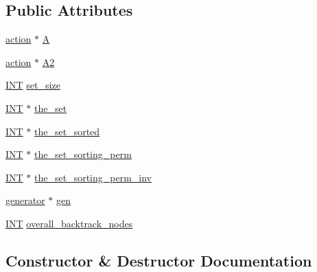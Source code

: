 \subsection*{Public Attributes}
\begin{DoxyCompactItemize}
\item 
\mbox{\hyperlink{classaction}{action}} $\ast$ \mbox{\hyperlink{classset__stabilizer__compute_a2d64c5c51d63999c9904b79b8d5dd7bf}{A}}
\item 
\mbox{\hyperlink{classaction}{action}} $\ast$ \mbox{\hyperlink{classset__stabilizer__compute_a903121f8202760ad84c96cc46a9ac1b2}{A2}}
\item 
\mbox{\hyperlink{galois_8h_a09fddde158a3a20bd2dcadb609de11dc}{I\+NT}} \mbox{\hyperlink{classset__stabilizer__compute_a03e43056f6968c46565e693a6788f24e}{set\+\_\+size}}
\item 
\mbox{\hyperlink{galois_8h_a09fddde158a3a20bd2dcadb609de11dc}{I\+NT}} $\ast$ \mbox{\hyperlink{classset__stabilizer__compute_a71c532d0589c53dcc166c061cffa171c}{the\+\_\+set}}
\item 
\mbox{\hyperlink{galois_8h_a09fddde158a3a20bd2dcadb609de11dc}{I\+NT}} $\ast$ \mbox{\hyperlink{classset__stabilizer__compute_a4e17cf5cd65318a15865edb1d323e655}{the\+\_\+set\+\_\+sorted}}
\item 
\mbox{\hyperlink{galois_8h_a09fddde158a3a20bd2dcadb609de11dc}{I\+NT}} $\ast$ \mbox{\hyperlink{classset__stabilizer__compute_a546dfc50866c57d9ce02efdebb494055}{the\+\_\+set\+\_\+sorting\+\_\+perm}}
\item 
\mbox{\hyperlink{galois_8h_a09fddde158a3a20bd2dcadb609de11dc}{I\+NT}} $\ast$ \mbox{\hyperlink{classset__stabilizer__compute_aead7ef45aa343878a07f518be02c70aa}{the\+\_\+set\+\_\+sorting\+\_\+perm\+\_\+inv}}
\item 
\mbox{\hyperlink{classgenerator}{generator}} $\ast$ \mbox{\hyperlink{classset__stabilizer__compute_a3f37f5aa70190264741e4648cb85abfb}{gen}}
\item 
\mbox{\hyperlink{galois_8h_a09fddde158a3a20bd2dcadb609de11dc}{I\+NT}} \mbox{\hyperlink{classset__stabilizer__compute_ae2bf302d2447d28990650b28de07b7ef}{overall\+\_\+backtrack\+\_\+nodes}}
\end{DoxyCompactItemize}


\subsection{Constructor \& Destructor Documentation}
\mbox{\label{classset__stabilizer__compute_a92626effc4df71a9244bc786d7cd3fef}} 

